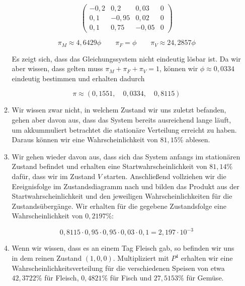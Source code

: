 \documentclass{homework}
\begin{document}
\begin{enumerate}
\begin{enumerate}
$$\left(\begin{array}{ccc|c}
-0,2	& 0,2	& 0,03	& 0\\
0,1		& -0,95	& 0,02	& 0\\
0,1		& 0,75	& -0,05	& 0
\end{array}\right)$$

$$\pi_M \approx 4,6429 \phi \qquad \pi_F = \phi \qquad \pi_V \approx 24,2857 \phi$$

Es zeigt sich, dass das Gleichungssystem nicht eindeutig lösbar ist. Da wir aber
wissen, dass gelten muss $\pi_M + \pi_F + \pi_V = 1$, können wir $\phi \approx 0,0334$
eindeutig bestimmen und erhalten dadurch

$$\pi \approx (0,1551, \quad 0,0334, \quad 0,8115)$$

\item Wir wissen zwar nicht, in welchem Zustand wir uns zuletzt befanden, gehen
aber davon aus, dass das System bereits ausreichend lange läuft, um akkummuliert
betrachtet die stationäre Verteilung erreicht zu haben. Daraus können wir eine
Wahrscheinlichkeit von $81,15\%$ ablesen.

\item Wir gehen wieder davon aus, dass sich das System anfangs im stationären
Zustand befindet und erhalten eine Startwahrscheinlichkeit von $81,14\%$ dafür,
dass wir im Zustand $V$ starten. Anschließend vollziehen wir die Ereignisfolge
im Zustandsdiagramm nach und bilden das Produkt aus der Startwahrscheinlichkeit
und den jeweiligen Wahrscheinlichkeiten für die Zustandsübergänge. Wir erhalten
für die gegebene Zustandsfolge eine Wahrscheinlichkeit von $0,2197\%$:

$$0,8115 \cdot 0,95 \cdot 0,95 \cdot 0,03 \cdot 0,1 = 2,197 \cdot 10^{-3}$$

\item Wenn wir wissen, dass es an einem Tag Fleisch gab, so befinden wir uns in
dem reinen Zustand $(1, 0, 0)$. Multipliziert mit $P^4$ erhalten wir eine
Wahrscheinlichkeitsverteilung für die verschiedenen Speisen von etwa $42,3722\%$
für Fleisch, $0,4821\%$ für Fisch und $27,5153\%$ für Gemüse.
\end{enumerate}

\end{enumerate}
\end{document}
